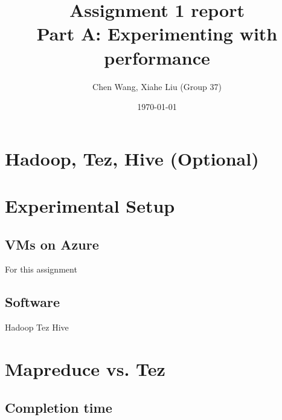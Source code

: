 \documentclass[10pt]{article}
\title{Assignment 1 report \\ Part A: Experimenting with performance} %
\author{Chen Wang, Xiahe Liu (Group 37)} %
\date{\today} %
\begin{document}
\maketitle %


\section{Hadoop, Tez, Hive (Optional)}


\section{Experimental Setup}

\subsection{VMs on Azure}
For this assignment 

\subsection{Software}
Hadoop
Tez
Hive



\section{Mapreduce vs. Tez}
\subsection{Completion time}
\end{document}
